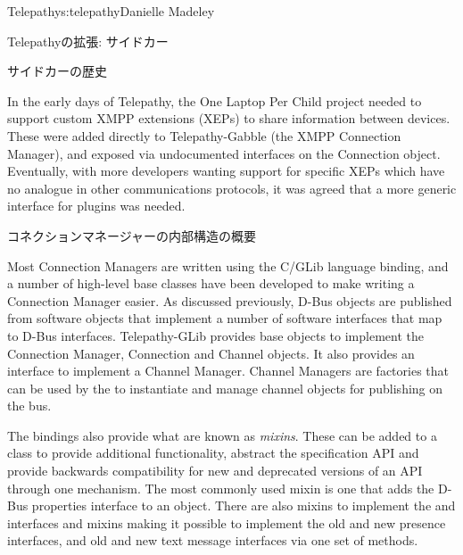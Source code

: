 \begin{aosachapter}{Telepathy}{s:telepathy}{Danielle Madeley}
\begin{aosasect1}{Telepathyの拡張: サイドカー}
\begin{aosabox}{サイドカーの歴史}

In the early days of Telepathy, the One Laptop Per Child project
needed to support custom XMPP extensions (XEPs) to share information
between devices. These were added directly to Telepathy-Gabble (the
XMPP Connection Manager), and exposed via undocumented interfaces on
the Connection object.  Eventually, with more developers wanting
support for specific XEPs which have no analogue in other
communications protocols, it was agreed that a more generic interface
for plugins was needed.

\end{aosabox}

\end{aosasect1}

\begin{aosasect1}{コネクションマネージャーの内部構造の概要}

Most Connection Managers are written using the C/GLib language
binding, and a number of high-level base classes have been developed
to make writing a Connection Manager easier.  As discussed previously,
D-Bus objects are published from software objects that implement a
number of software interfaces that map to D-Bus
interfaces. Telepathy-GLib provides base objects to implement the
Connection Manager, Connection and Channel objects. It also provides
an interface to implement a Channel Manager. Channel Managers are
factories that can be used by the  to instantiate
and manage channel objects for publishing on the bus.

The bindings also provide what are known as \emph{mixins}.  These can
be added to a class to provide additional functionality, abstract the
specification API and provide backwards compatibility for new and
deprecated versions of an API through one mechanism. The most commonly
used mixin is one that adds the D-Bus properties interface to an
object. There are also mixins to implement the
 and
 interfaces and mixins making it
possible to implement the old and new presence interfaces, and old and
new text message interfaces via one set of methods.



\end{aosasect1}
\end{aosachapter}

